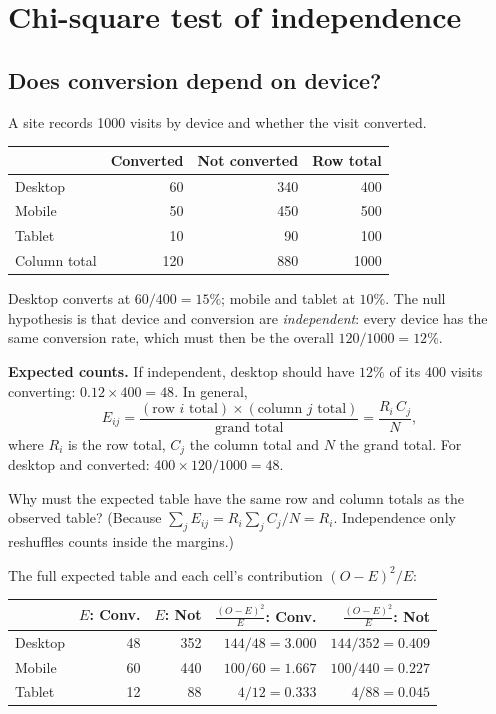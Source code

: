 \section{Chi-square test of independence}
\label{sec:cg-indep}

\subsection{Does conversion depend on device?}

A site records 1000 visits by device and whether the visit converted.

\begin{center}
\begin{tabular}{lrr|r}
\toprule
 & Converted & Not converted & Row total \\
\midrule
Desktop & 60 & 340 & 400 \\
Mobile & 50 & 450 & 500 \\
Tablet & 10 & 90 & 100 \\
\midrule
Column total & 120 & 880 & 1000 \\
\bottomrule
\end{tabular}
\end{center}

Desktop converts at $60/400 = 15\%$; mobile and tablet at $10\%$. The null
hypothesis is that device and conversion are \emph{independent}: every device
has the same conversion rate, which must then be the overall
$120/1000 = 12\%$.

\textbf{Expected counts.} If independent, desktop should have $12\%$ of its 400
visits converting: $0.12 \times 400 = 48$. In general,
\[
  E_{ij} = \frac{(\text{row } i \text{ total}) \times (\text{column } j \text{ total})}{\text{grand total}}
         = \frac{R_i\, C_j}{N},
\]
where $R_i$ is the row total, $C_j$ the column total and $N$ the grand total.
For desktop and converted: $400 \times 120 / 1000 = 48$.

\begin{recoverybox}
Why must the expected table have the same row and column
totals as the observed table? (Because $\sum_j E_{ij} = R_i \sum_j C_j / N =
R_i$. Independence only reshuffles counts inside the margins.)
\end{recoverybox}

The full expected
table and each cell's contribution $(O-E)^2/E$:

\begin{center}
\begin{tabular}{lrr|rr}
\toprule
 & $E$: Conv. & $E$: Not & $\frac{(O-E)^2}{E}$: Conv. & $\frac{(O-E)^2}{E}$: Not \\
\midrule
Desktop & 48 & 352 & $144/48 = 3.000$ & $144/352 = 0.409$ \\
Mobile & 60 & 440 & $100/60 = 1.667$ & $100/440 = 0.227$ \\
Tablet & 12 & 88 & $4/12 = 0.333$ & $4/88 = 0.045$ \\
\bottomrule
\end{tabular}
\end{center}

